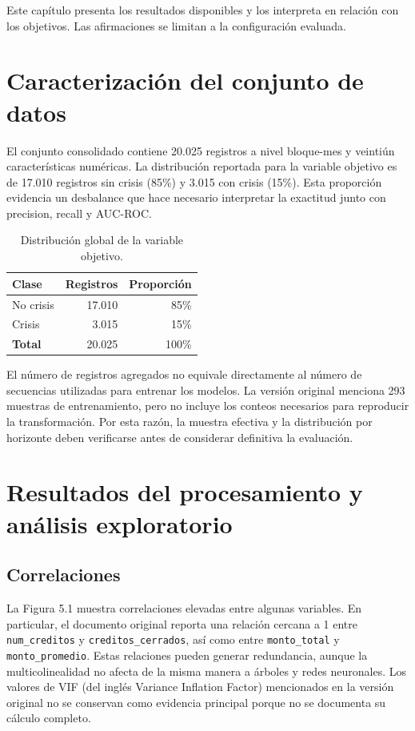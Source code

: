 Este capítulo presenta los resultados disponibles y los interpreta en relación con los objetivos. Las afirmaciones se limitan a la configuración evaluada.

\section{Caracterización del conjunto de datos}

El conjunto consolidado contiene 20.025 registros a nivel bloque-mes y veintiún características numéricas. La distribución reportada para la variable objetivo es de 17.010 registros sin crisis (85\%) y 3.015 con crisis (15\%). Esta proporción evidencia un desbalance que hace necesario interpretar la exactitud junto con precision, recall y AUC-ROC.

\begin{table}[H]
    \centering
    \begin{tabular}{|l|r|r|}
    \hline
        \textbf{Clase} & \textbf{Registros} & \textbf{Proporción} \\
    \hline
        No crisis & 17.010 & 85\% \\
    \hline
        Crisis & 3.015 & 15\% \\
    \hline
        \textbf{Total} & 20.025 & 100\% \\
    \hline
    \end{tabular}
    \caption{Distribución global de la variable objetivo.}
    \label{tab:dist_objetivo}
    \end{table}

El número de registros agregados no equivale directamente al número de secuencias utilizadas para entrenar los modelos. La versión original menciona 293 muestras de entrenamiento, pero no incluye los conteos necesarios para reproducir la transformación. Por esta razón, la muestra efectiva y la distribución por horizonte deben verificarse antes de considerar definitiva la evaluación.

\section{Resultados del procesamiento y \newline análisis exploratorio}

\subsection{Correlaciones}

La Figura 5.1 muestra correlaciones elevadas entre algunas variables. En particular, el documento original reporta una relación cercana a 1 entre \texttt{num\_creditos} y \texttt{creditos\_cerrados}, así como entre \texttt{monto\_total} y \texttt{monto\_promedio}. Estas relaciones pueden generar redundancia, aunque la multicolinealidad no afecta de la misma manera a árboles y redes neuronales. Los valores de VIF (del inglés Variance Inflation Factor) mencionados en la versión original no se conservan como evidencia principal porque no se documenta su cálculo completo.

